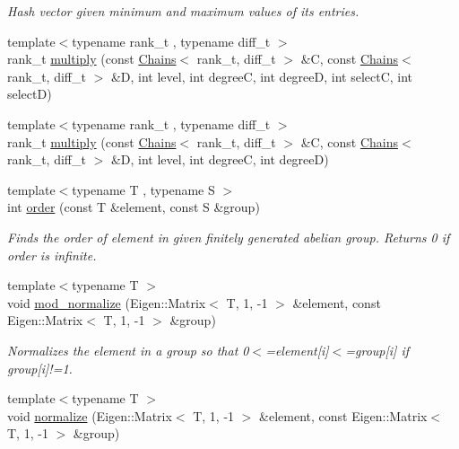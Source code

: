 \begin{DoxyCompactItemize}
\begin{DoxyCompactList}\small\item\em Hash vector given minimum and maximum values of its entries. \end{DoxyCompactList}\item 
{\footnotesize template$<$typename rank\+\_\+t , typename diff\+\_\+t $>$ }\\rank\+\_\+t \hyperlink{namespaceMackey_a80dbde3a859378ede596b48869ec50d9}{multiply} (const \hyperlink{classMackey_1_1Chains}{Chains}$<$ rank\+\_\+t, diff\+\_\+t $>$ \&C, const \hyperlink{classMackey_1_1Chains}{Chains}$<$ rank\+\_\+t, diff\+\_\+t $>$ \&D, int level, int degreeC, int degreeD, int selectC, int selectD)
\item 
{\footnotesize template$<$typename rank\+\_\+t , typename diff\+\_\+t $>$ }\\rank\+\_\+t \hyperlink{namespaceMackey_a2eca4cc709501ad3fc20b82fe4bcbd33}{multiply} (const \hyperlink{classMackey_1_1Chains}{Chains}$<$ rank\+\_\+t, diff\+\_\+t $>$ \&C, const \hyperlink{classMackey_1_1Chains}{Chains}$<$ rank\+\_\+t, diff\+\_\+t $>$ \&D, int level, int degreeC, int degreeD)
\item 
{\footnotesize template$<$typename T , typename S $>$ }\\int \hyperlink{namespaceMackey_a4abdca157edcf425b1e7ceff39d74c2f}{order} (const T \&element, const S \&group)
\begin{DoxyCompactList}\small\item\em Finds the order of element in given finitely generated abelian group. Returns 0 if order is infinite. \end{DoxyCompactList}\item 
{\footnotesize template$<$typename T $>$ }\\void \hyperlink{namespaceMackey_a320b32b8fd44ee75d9f08aa0665c4ec7}{mod\+\_\+normalize} (Eigen\+::\+Matrix$<$ T, 1, -\/1 $>$ \&element, const Eigen\+::\+Matrix$<$ T, 1, -\/1 $>$ \&group)
\begin{DoxyCompactList}\small\item\em Normalizes the element in a group so that 0$<$=element\mbox{[}i\mbox{]}$<$=group\mbox{[}i\mbox{]} if group\mbox{[}i\mbox{]}!=1. \end{DoxyCompactList}\item 
{\footnotesize template$<$typename T $>$ }\\void \hyperlink{namespaceMackey_a43e260f55a458bed50ab6a75aef7e666}{normalize} (Eigen\+::\+Matrix$<$ T, 1, -\/1 $>$ \&element, const Eigen\+::\+Matrix$<$ T, 1, -\/1 $>$ \&group)

\end{DoxyCompactItemize}
